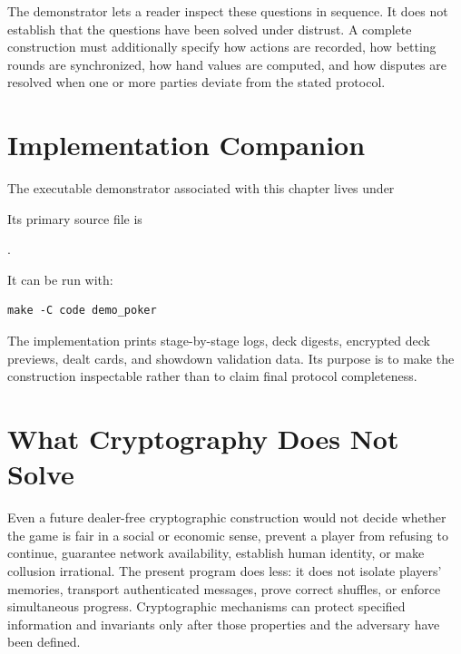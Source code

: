 The demonstrator lets a reader inspect these questions in sequence.  It does
not establish that the questions have been solved under distrust.  A complete
construction must additionally specify how actions are recorded, how betting
rounds are synchronized, how hand values are computed, and how disputes are
resolved when one or more parties deviate from the stated protocol.

\section{Implementation Companion}
The executable demonstrator associated with this chapter lives under
\begin{center}
\end{center}
Its primary source file is
\begin{center}
.
\end{center}
It can be run with:
\begin{verbatim}
make -C code demo_poker
\end{verbatim}

The implementation prints stage-by-stage logs, deck digests, encrypted deck
previews, dealt cards, and showdown validation data. Its purpose is to make the
construction inspectable rather than to claim final protocol completeness.

\section{What Cryptography Does Not Solve}
Even a future dealer-free cryptographic construction would not decide whether
the game is fair in a social or economic sense, prevent a player from refusing
to continue, guarantee network availability, establish human identity, or make
collusion irrational.  The present program does less: it does not isolate
players' memories, transport authenticated messages, prove correct shuffles,
or enforce simultaneous progress.  Cryptographic mechanisms can protect
specified information and invariants only after those properties and the
adversary have been defined.

